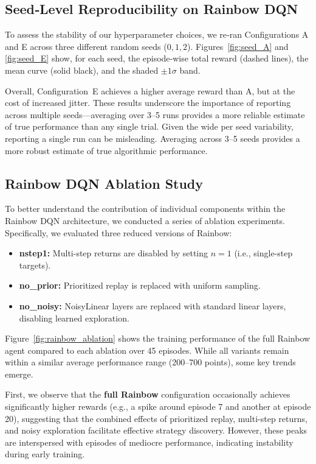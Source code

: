 \documentclass{article}
\begin{document}
\subsection{Seed‐Level Reproducibility on Rainbow DQN}

To assess the stability of our hyperparameter choices, we re‑ran Configurations A and E across three different random seeds (\(0,1,2\)). Figures~\ref{fig:seed_A} and \ref{fig:seed_E} show, for each seed, the episode‑wise total reward (dashed lines), the mean curve (solid black), and the shaded \(\pm1\sigma\) band.

Overall, Configuration E achieves a higher average reward than A, but at the cost of increased jitter. These results underscore the importance of reporting across multiple seeds—averaging over 3–5 runs provides a more reliable estimate of true performance than any single trial. Given the wide per seed variability, reporting a single run can be misleading. Averaging across 3–5 seeds provides a more robust estimate of true algorithmic performance.


\subsection{Rainbow DQN Ablation Study}

To better understand the contribution of individual components within the Rainbow DQN architecture, we conducted a series of ablation experiments. Specifically, we evaluated three reduced versions of Rainbow:
\begin{itemize}
    \item \textbf{nstep1:} Multi-step returns are disabled by setting $n=1$ (i.e., single-step targets).
    \item \textbf{no\_prior:} Prioritized replay is replaced with uniform sampling.
    \item \textbf{no\_noisy:} NoisyLinear layers are replaced with standard linear layers, disabling learned exploration.
\end{itemize}

Figure~\ref{fig:rainbow_ablation} shows the training performance of the full Rainbow agent compared to each ablation over 45 episodes. While all variants remain within a similar average performance range (200–700 points), some key trends emerge.

First, we observe that the \textbf{full Rainbow} configuration occasionally achieves significantly higher rewards (e.g., a spike around episode 7 and another at episode 20), suggesting that the combined effects of prioritized replay, multi-step returns, and noisy exploration facilitate effective strategy discovery. However, these peaks are interspersed with episodes of mediocre performance, indicating instability during early training.
\end{document}

